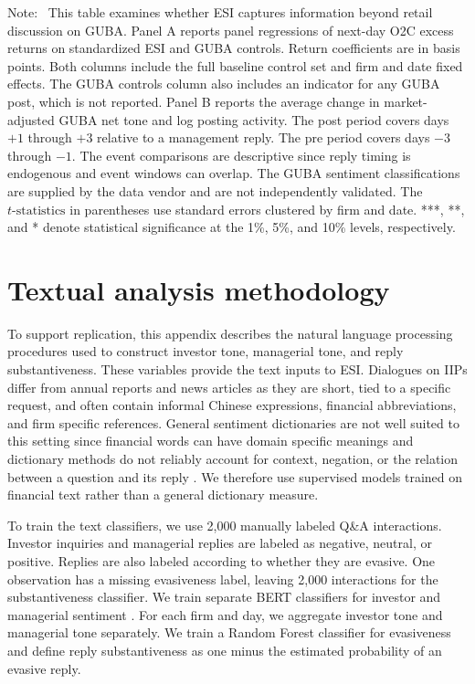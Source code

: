 \documentclass[12pt]{article}
\newenvironment{tablenoteblock}
{%
  \vspace{0.12cm}
  \begin{tablenotes}[flushleft]
  \footnotesize
  \setlength{\itemsep}{0pt}
  \setlength{\parsep}{0pt}
  \item[]\justifying
  \textnormal{Note:}\ 
}
{%
  \end{tablenotes}
}
\begin{document}
\begin{table}[H]
\begin{threeparttable}
\begin{tablenoteblock}
    This table examines whether ESI captures information beyond retail discussion on GUBA. Panel A reports panel regressions of next-day O2C excess returns on standardized ESI and GUBA controls. Return coefficients are in basis points. Both columns include the full baseline control set and firm and date fixed effects. The GUBA controls column also includes an indicator for any GUBA post, which is not reported. Panel B reports the average change in market-adjusted GUBA net tone and log posting activity. The post period covers days $+1$ through $+3$ relative to a management reply. The pre period covers days $-3$ through $-1$. The event comparisons are descriptive since reply timing is endogenous and event windows can overlap. The GUBA sentiment classifications are supplied by the data vendor and are not independently validated. The $t\text{-statistics}$ in parentheses use standard errors clustered by firm and date. ***, **, and * denote statistical significance at the 1\%, 5\%, and 10\% levels, respectively.
  \end{tablenoteblock}
  \end{threeparttable}
\end{table}
\clearpage



\section{Textual analysis methodology} \label{app:nlp_methodology}

To support replication, this appendix describes the natural language processing procedures used to construct investor tone, managerial tone, and reply substantiveness. These variables provide the text inputs to ESI. Dialogues on IIPs differ from annual reports and news articles as they are short, tied to a specific request, and often contain informal Chinese expressions, financial abbreviations, and firm specific references. General sentiment dictionaries are not well suited to this setting since financial words can have domain specific meanings and dictionary methods do not reliably account for context, negation, or the relation between a question and its reply \citep{loughran2011}. We therefore use supervised models trained on financial text rather than a general dictionary measure.

To train the text classifiers, we use 2,000 manually labeled Q\&A interactions. Investor inquiries and managerial replies are labeled as negative, neutral, or positive. Replies are also labeled according to whether they are evasive. One observation has a missing evasiveness label, leaving 2,000 interactions for the substantiveness classifier. We train separate BERT classifiers for investor and managerial sentiment \citep{liu2020finbert}. For each firm and day, we aggregate investor tone and managerial tone separately. We train a Random Forest classifier for evasiveness and define reply substantiveness as one minus the estimated probability of an evasive reply.
\end{document}
